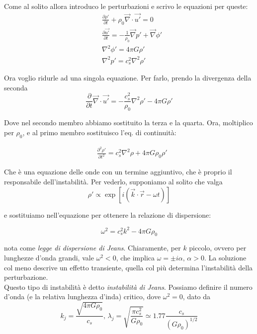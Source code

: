 \documentclass{report}
\begin{document}
Come al solito allora introduco le perturbazioni e scrivo le equazioni per queste: 
\begin{align}
    &\frac{\partial \rho'}{\partial t} + \rho_0\vec{\nabla}\cdot \vec{u'} = 0 \\
    & \frac{\partial \vec{u'}}{\partial t} = -\frac{1}{\rho_0}\vec{\nabla}p' + \vec{\nabla}\phi' \\
    & \nabla^2\phi' = 4\pi G\rho' \\ 
    & \nabla^2p' = c_s^2\nabla^2\rho'
\end{align}

Ora voglio ridurle ad una singola equazione. Per farlo, prendo la divergenza della seconda 
\begin{equation}
    \frac{\partial}{\partial t}\vec{\nabla}\cdot \vec{u'} = -\frac{c_s^2}{\rho_0}\nabla^2 \rho' - 4\pi G\rho'
\end{equation}

Dove nel secondo membro abbiamo sostituito la terza e la quarta. Ora, moltiplico per $\rho_0$, e al primo membro sostituisco l'eq. di continuità: 

\begin{align}
    & \frac{\partial^2 \rho'}{\partial t^2} = c_s^2\nabla^2 \rho + 4\pi G\rho_0\rho'
\end{align}

Che è una equazione delle onde con un termine aggiuntivo, che è proprio il responsabile dell'instabilità. Per vederlo, supponiamo al solito che valga 
\begin{equation}
    \rho' \propto \exp{[i(\vec{k}\cdot \vec{r} - \omega t)]}
\end{equation}

e sostituiamo nell'equazione per ottenere la relazione di dispersione: 
\begin{tcolorbox}[colback=myg!15, colframe=black, boxrule=1pt]
\begin{equation}
    \omega^2 = c_s^2k^2 - 4\pi G\rho_0
\end{equation}
\end{tcolorbox}

nota come \emph{legge di dispersione di Jeans}. Chiaramente, per $k$ piccolo, ovvero per lunghezze d'onda grandi, vale $\omega^2 < 0$, che implica $\omega = \pm i\alpha, \, \alpha >0$. La soluzione col meno descrive un effetto transiente, quella col più determina l'instabilità della perturbazione. \\

Questo tipo di instabilità è detto \emph{instabilità di Jeans}. Possiamo definire il numero d'onda (e la relativa lunghezza d'inda) critico, dove $\omega^2 = 0$, dato da 
\begin{equation}
    k_j = \frac{\sqrt{4\pi G\rho_0}}{c_s} , \, \lambda_j = \sqrt{\frac{\pi c_s^2}{G\rho_0}} \simeq 1.77 \frac{c_s}{(G\rho_0)^{1/2}}
\end{equation}
\end{document}
